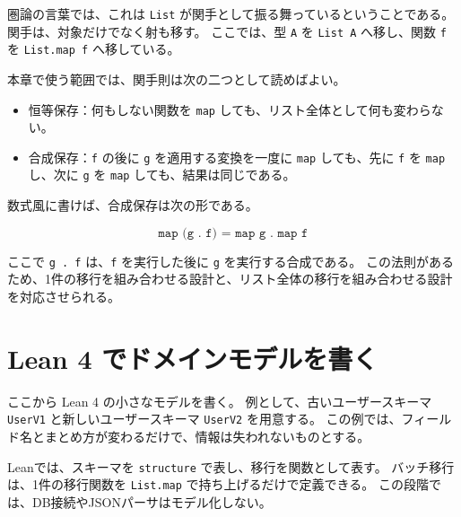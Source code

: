 圏論の言葉では、これは \texttt{List} が関手として振る舞っているということである。
関手は、対象だけでなく射も移す。
ここでは、型 \texttt{A} を \texttt{List A} へ移し、関数 \texttt{f} を \texttt{List.map f} へ移している。

\begin{definitionbox}
本章で使う範囲では、関手則は次の二つとして読めばよい。
\begin{itemize}
\item 恒等保存：何もしない関数を \texttt{map} しても、リスト全体として何も変わらない。
\item 合成保存：\texttt{f} の後に \texttt{g} を適用する変換を一度に \texttt{map} しても、先に \texttt{f} を \texttt{map} し、次に \texttt{g} を \texttt{map} しても、結果は同じである。
\end{itemize}
\end{definitionbox}

数式風に書けば、合成保存は次の形である。

\[
  \texttt{map (g . f) = map g . map f}
\]

ここで \texttt{g . f} は、\texttt{f} を実行した後に \texttt{g} を実行する合成である。
この法則があるため、1件の移行を組み合わせる設計と、リスト全体の移行を組み合わせる設計を対応させられる。


\section{Lean 4 でドメインモデルを書く}

ここから Lean 4 の小さなモデルを書く。
例として、古いユーザースキーマ \texttt{UserV1} と新しいユーザースキーマ \texttt{UserV2} を用意する。
この例では、フィールド名とまとめ方が変わるだけで、情報は失われないものとする。

\begin{leanbox}
Leanでは、スキーマを \texttt{structure} で表し、移行を関数として表す。
バッチ移行は、1件の移行関数を \texttt{List.map} で持ち上げるだけで定義できる。
この段階では、DB接続やJSONパーサはモデル化しない。
\end{leanbox}

